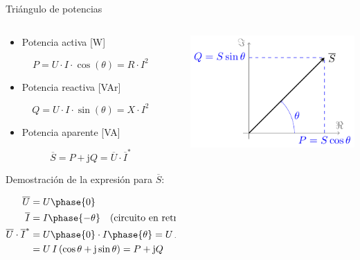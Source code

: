 \documentclass[aspectratio=169, usenames,svgnames,dvipsnames]{beamer}
\begin{document}
\begin{frame}{Triángulo de potencias}
    \begin{columns} 
    \begin{column}{0.6\columnwidth}
    \vspace{2mm}
    \begin{itemize}
        \item Potencia activa [W]
    \end{itemize}
    \[  
        \boxed{P = U\cdot I\cdot\cos(\theta) = R \cdot I^2}
    \]
    
    \begin{itemize}
        \item Potencia reactiva [VAr]
    \end{itemize}
    \[
        \boxed{Q = U\cdot I\cdot\sin(\theta) = X \cdot I^2}
    \]
    
    \begin{itemize}
        \item Potencia aparente [VA]
    \end{itemize}
    \[
        \boxed{\overline{S} = P + \mathrm{j}Q = \overline{U} \cdot \overline{I}^*}
    \]
    
    \hspace{8mm}Demostración de la expresión para $\overline{S}$:

    \vspace{-7mm}
    {\begin{align*}
        \overline{U} &= U\phase{0}\\
        \overline{I} &= I\phase{-\theta} \quad \text{(circuito en retraso)}\\
        \overline{U}\cdot\overline{I}^* &= U\phase{0} \cdot I\phase{\theta} = U\,I\phase{\theta}=\\
        &=U\,I\, (\cos\theta + \mathrm{j} \sin\theta) = P + \mathrm{j} Q
    \end{align*}}
    \end{column}
    
    \begin{column}{0.4\columnwidth}
    \vspace{-3mm}
    
        \hspace{-15mm}
        \includegraphics[width=1.2\linewidth]{../figs/trianguloPotencias.pdf}    
    

\end{column}
\end{columns}
\end{frame}
\end{document}
